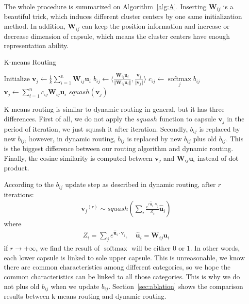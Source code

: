 \documentclass[times,twocolumn,final]{elsarticle}
\begin{document}
The whole procedure is summarized on Algorithm~\ref{alg:A}. Inserting $\mathbf{W}_{ij}$ is a beautiful trick, which induces different cluster centers by one same initialization method. In addition, $\mathbf{W}_{ij}$ can keep the position information and increase or decrease dimension of capsule, which means the cluster centers have enough representation ability.

\begin{algorithm}
  \caption{K-means Routing}
  \label{alg:A}
  \begin{algorithmic}[1]
    \State Initialize $\mathbf{v}_j \leftarrow \frac{1}{k} \sum\limits_{i=1}^n \mathbf{W}_{ij} \mathbf{u}_i$
	 \State $b_{ij} \leftarrow \langle\frac{\mathbf{W}_{ij}\mathbf{u}_i}{\Vert\mathbf{W}_{ij}\mathbf{u}_i\Vert}, \frac{\mathbf{v}_j}{\Vert\mathbf{v}_j\Vert}\rangle$
      \State $c_{ij} \leftarrow \mathop{softmax}\limits_j b_{ij}$
	  \State $\mathbf{v}_j \leftarrow \sum\limits_{i=1}^n c_{ij} \mathbf{W}_{ij} \mathbf{u}_i$
	\EndFor
	\State \Return $squash(\mathbf{v}_j)$
	\EndProcedure
  \end{algorithmic}
\end{algorithm}

K-means routing is similar to dynamic routing in general, but it has three differences. First of all, we do not apply the $squash$ function to capsule $\mathbf{v}_j$ in the period of iteration, we just squash it after iteration. Secondly, $b_{ij}$ is replaced by new $b_{ij}$, however, in dynamic routing, $b_{ij}$ is replaced by new $b_{ij}$ plus old $b_{ij}$. This is the biggest difference between our routing algorithm and dynamic routing. Finally, the cosine similarity is computed between $\mathbf{v}_j$ and $\mathbf{W}_{ij} \mathbf{u}_i$ instead of dot product.

According to the $b_{ij}$ update step as described in dynamic routing, after $r$ iterations:
    \begin{align}
      {\mathbf{v}_j}^{(r)} \sim squash\left(\sum_{i} \frac{e^{r \hat{\mathbf{u}}_i \cdot \mathbf{v}_j}}{Z_i} \hat{\mathbf{u}}_i \right)
    \end{align}
where 
    \begin{align}
      Z_i = \sum_{j} e^{\hat{\mathbf{u}}_i \cdot \mathbf{v}_j}, \quad \hat{\mathbf{u}}_i = \mathbf{W}_{ij} \mathbf{u}_i
    \end{align}
if $r \rightarrow + \infty $, we find the result of $\mathop{softmax}$ will be either $0$ or $1$. In other words, each lower capsule is linked to sole upper capsule. This is unreasonable, we know there are common characteristics among different categories, so we hope the common characteristics can be linked to all those categories. This is why we do not plus old $b_{ij}$ when we update $b_{ij}$. Section~\ref{sec:ablation} shows the comparison results between k-means routing and dynamic routing.
\end{document}
